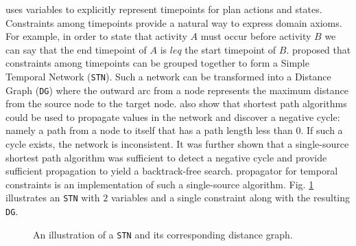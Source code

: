 \eu uses variables to explicitly represent timepoints for plan actions
and states. Constraints among timepoints provide a natural way to
express domain axioms. For example, in order to state that activity
$A$ must occur before activity $B$ we can say that the end timepoint
of $A$ is $leq$ the start timepoint of $B$.  \cite{dechter91} proposed
that constraints among timepoints can be grouped together to form a
Simple Temporal Network (\texttt{STN}). Such a network can be
transformed into a Distance Graph (\texttt{DG}) where the outward arc
from a node represents the maximum distance from the source node to
the target node.   also show that shortest path
algorithms  could be used
to propagate values in the network and discover a negative cycle:
namely a path from a node to itself that has a path length less than
$0$. If such a cycle exists, the network is 
inconsistent. It was further shown that a single-source shortest path
algorithm was sufficient to detect a negative cycle and provide
sufficient propagation to yield a backtrack-free search. \eus
propagator for temporal constraints is an implementation of such a
single-source algorithm. Fig. \ref{fig:stn} illustrates an
\texttt{STN} with $2$ variables and a single constraint along with the
resulting \texttt{DG}.

\begin{figure}[!htb]
  \centering
  \caption{\small An illustration of a \texttt{STN} and its
    corresponding distance graph.}
  \label{fig:stn}
\end{figure}

